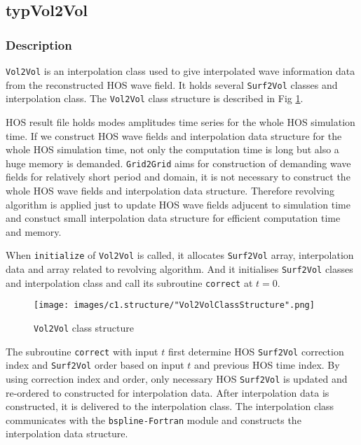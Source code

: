 	\pagebreak
	\subsection{typVol2Vol}

	\subsubsection{Description}

	\texttt{Vol2Vol} is an interpolation class used to give interpolated wave information data from the reconstructed HOS wave field. It holds several \texttt{Surf2Vol} classes and interpolation class. The \texttt{Vol2Vol} class structure is described in Fig \ref{fig:vol2volStructure}. 

	HOS result file holds modes amplitudes time series for the whole HOS simulation time. If we construct HOS wave fields and interpolation data structure for the whole HOS simulation time, not only the computation time is long but also a huge memory is demanded. \texttt{Grid2Grid} aims for construction of demanding wave fields for relatively short period and domain, it is not necessary to construct the whole HOS wave fields and interpolation data structure. Therefore revolving algorithm is applied just to update HOS wave fields adjucent to simulation time and constuct small interpolation data structure for efficient computation time and memory.  

	When \texttt{initialize} of \texttt{Vol2Vol} is called, it allocates \texttt{Surf2Vol} array, interpolation data and array related to revolving algorithm. And it initialises \texttt{Surf2Vol} classes and interpolation class and call its subroutine \texttt{correct} at $t=0$.

	{
		\begin{figure} [H]
			\centering
			\texttt{[image: images/c1.structure/"Vol2VolClassStructure".png]}
			\vspace{0.2cm}
			\caption{\texttt{Vol2Vol} class structure}
			\label{fig:vol2volStructure}
		\end{figure}
	}

	\pagebreak

	The subroutine \texttt{correct} with input $t$ first determine HOS \texttt{Surf2Vol} correction index and \texttt{Surf2Vol} order based on input $t$ and previous HOS time index. By using correction index and order, only necessary HOS \texttt{Surf2Vol} is updated and re-ordered to constructed for interpolation data. After interpolation data is constructed, it is delivered to the interpolation class. The interpolation class communicates with the \texttt{bspline-Fortran} module and constructs the interpolation data structure. 


